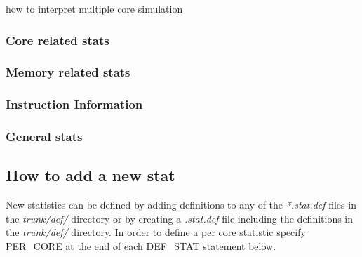       how to interpret multiple core simulation 
\subsubsection{Core related stats}
\subsubsection{Memory related stats} 
\subsubsection{Instruction Information}
\subsubsection{General stats}

\subsection{How to add a new stat}

New statistics can be defined by adding definitions to any of the
\textit{*.stat.def} files in the \textit{trunk/def/} directory or by creating a
\textit{.stat.def} file including the definitions in the \textit{trunk/def/}
directory.  In order to define a per core statistic specify PER\_CORE at the
end of each DEF\_STAT statement below.


